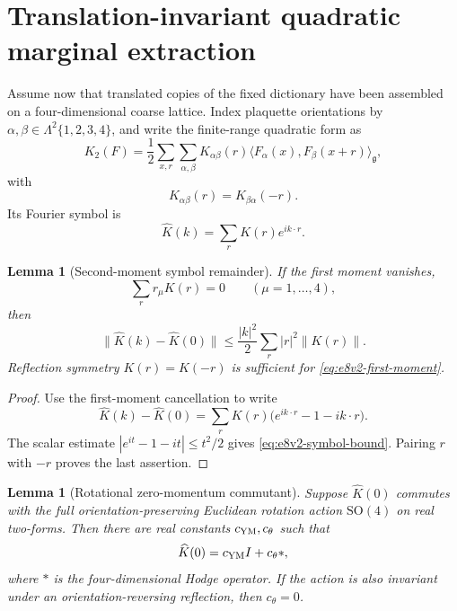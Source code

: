\documentclass[11pt,oneside]{book}
\newtheorem{lemma}[theorem]{Lemma}
\theoremstyle{definition}
\theoremstyle{remark}
\begin{document}
\section{Translation-invariant quadratic marginal extraction}
\label{sec:e8v2-symbol}

Assume now that translated copies of the fixed dictionary have been
assembled on a four-dimensional coarse lattice.  Index plaquette
orientations by \(\alpha,\beta\in\Lambda^2\{1,2,3,4\}\), and write the
finite-range quadratic form as
\[
 K_2(F)
 =
 \frac12\sum_{x,r}\sum_{\alpha,\beta}
 K_{\alpha\beta}(r)
 \langle F_\alpha(x),F_\beta(x+r)\rangle_{\mathfrak g},
                                                        \label{eq:e8v2-translation}
\]
with
\[
 K_{\alpha\beta}(r)=K_{\beta\alpha}(-r).             \label{eq:e8v2-Hermitian}
\]
Its Fourier symbol is
\[
 \widehat K(k)=\sum_rK(r)e^{ik\cdot r}.              \label{eq:e8v2-symbol}
\]

\begin{lemma}[Second-moment symbol remainder]
\label{lem:e8v2-symbol}
If the first moment vanishes,
\[
 \sum_r r_\mu K(r)=0\qquad(\mu=1,\ldots,4),          \label{eq:e8v2-first-moment}
\]
then
\[
 \|\widehat K(k)-\widehat K(0)\|
 \leq
 \frac{|k|^2}{2}
 \sum_r|r|^2\|K(r)\|.                                \label{eq:e8v2-symbol-bound}
\]
Reflection symmetry \(K(r)=K(-r)\) is sufficient for
\eqref{eq:e8v2-first-moment}.
\end{lemma}

\begin{proof}
Use the first-moment cancellation to write
\[
 \widehat K(k)-\widehat K(0)
 =
 \sum_rK(r)\bigl(e^{ik\cdot r}-1-ik\cdot r\bigr).
\]
The scalar estimate
\(|e^{it}-1-it|\leq t^2/2\) gives
\eqref{eq:e8v2-symbol-bound}.  Pairing \(r\) with \(-r\) proves the
last assertion.
\end{proof}

\begin{lemma}[Rotational zero-momentum commutant]
\label{lem:e8v2-commutant}
Suppose \(\widehat K(0)\) commutes with the full
orientation-preserving Euclidean rotation action
\(\mathrm{SO}(4)\) on real two-forms.  Then there are real constants
\(c_{\rm YM},c_\theta\) such that
\[
 \widehat K(0)=c_{\rm YM}I+c_\theta *,
                                                        \label{eq:e8v2-commutant}
\]
where \(*\) is the four-dimensional Hodge operator.  If the action is
also invariant under an orientation-reversing reflection, then
\(c_\theta=0\).
\end{lemma}
\end{document}
